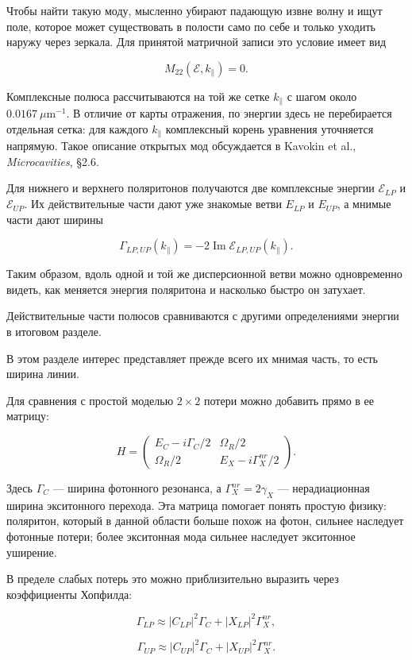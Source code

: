 \documentclass[12pt,a4paper]{article}
\begin{document}
Чтобы найти такую моду, мысленно убирают падающую извне волну и ищут поле, которое может существовать в полости само по себе и только уходить наружу через зеркала. Для принятой матричной записи это условие имеет вид

\[
M_{22}(\mathcal E,k_\parallel)=0.
\]

Комплексные полюса рассчитываются на той же сетке $k_\parallel$ с шагом около $0.0167\ \mu\mathrm m^{-1}$. В отличие от карты отражения, по энергии здесь не перебирается отдельная сетка: для каждого $k_\parallel$ комплексный корень уравнения уточняется напрямую. Такое описание открытых мод обсуждается в Kavokin et al., \textit{Microcavities}, \S2.6.

Для нижнего и верхнего поляритонов получаются две комплексные энергии $\mathcal E_{LP}$ и $\mathcal E_{UP}$. Их действительные части дают уже знакомые ветви $E_{LP}$ и $E_{UP}$, а мнимые части дают ширины

\[
\Gamma_{LP,UP}(k_\parallel)
=-2\operatorname{Im}\mathcal E_{LP,UP}(k_\parallel).
\]

Таким образом, вдоль одной и той же дисперсионной ветви можно одновременно видеть, как меняется энергия поляритона и насколько быстро он затухает. 

Действительные части полюсов сравниваются с другими определениями энергии в итоговом разделе.

 В этом разделе интерес представляет прежде всего их мнимая часть, то есть ширина линии.

Для сравнения с простой моделью $2\times2$ потери можно добавить прямо в ее матрицу:

\[
H=
\begin{pmatrix}
E_C-i\Gamma_C/2 & \Omega_R/2\\
\Omega_R/2 & E_X-i\Gamma_X^{nr}/2
\end{pmatrix}.
\]

Здесь $\Gamma_C$ --- ширина фотонного резонанса, а $\Gamma_X^{nr}=2\gamma_X$ --- нерадиационная ширина экситонного перехода. Эта матрица помогает понять простую физику: поляритон, который в данной области больше похож на фотон, сильнее наследует фотонные потери; более экситонная мода сильнее наследует экситонное уширение.

В пределе слабых потерь это можно приблизительно выразить через коэффициенты Хопфилда:

\[
\Gamma_{LP}
\approx
|C_{LP}|^2\Gamma_C
+
|X_{LP}|^2\Gamma_X^{nr},
\]

\[
\Gamma_{UP}
\approx
|C_{UP}|^2\Gamma_C
+
|X_{UP}|^2\Gamma_X^{nr}.
\]
\end{document}
